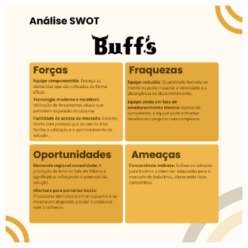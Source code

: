 \documentclass[
  a4paper,%
  12pt,%
  english,%
  brazilian,%
]{article}
\begin{document}
\begin{figure}[h]
  \centering
  \includegraphics[width=0.8\textwidth]{Logos/SWOT.png}
  \label{fig:swot}
\end{figure}
\end{document}
